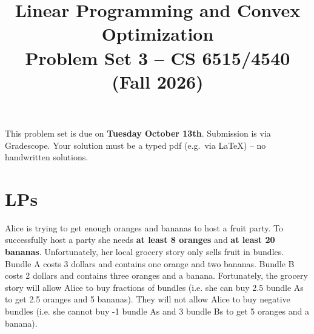 \documentclass[10pt,letterpaper]{article}
\title{Linear Programming and Convex Optimization\\Problem Set 3 -- CS 6515/4540 (Fall 2026)}
\date{}
\newcommand{\jan}[1]{\textcolor{red}{Jan: #1}}
\begin{document}
\maketitle
\vspace{-50pt}
\noindent
This problem set is due on \textbf{Tuesday October 13th}. Submission is via Gradescope. Your solution must be a typed pdf (e.g.~via LaTeX) -- no handwritten solutions.




\setcounter{section}{9}





\section{LPs}
    Alice is trying to get enough oranges and bananas to host a fruit party. To successfully host a party she needs \textbf{at least 8 oranges} and \textbf{at least 20 bananas}. Unfortunately, her local grocery story only sells fruit in bundles. Bundle A costs 3 dollars and contains one orange and two bananas. Bundle B costs 2 dollars and contains three oranges and a banana. Fortunately, the grocery story will allow Alice to buy fractions of bundles (i.e. she can buy 2.5 bundle As to get 2.5 oranges and 5 bananas). They will not allow Alice to buy negative bundles (i.e. she cannot buy -1 bundle As and 3 bundle Bs to get 5 oranges and a banana). 
\end{document}
